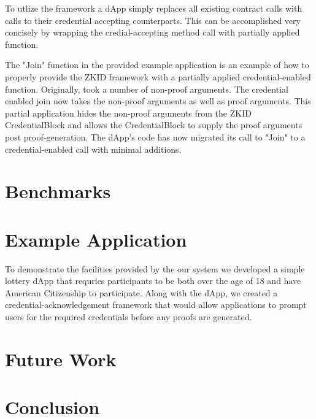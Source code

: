 \documentclass[11 pt]{extarticle}
\theoremstyle{remark}
\begin{document}
To utlize the framework a dApp simply replaces all existing contract calls with calls to their credential accepting counterparts. 
This can be accomplished very concisely by wrapping the credial-accepting method call with partially applied
function.

The "Join" function in the provided example application is an example of how to properly provide the ZKID framework with a partially applied credential-enabled function. Originally, took a number of non-proof arguments. 
The credential enabled join now takes the non-proof arguments as well as proof arguments. This partial application hides the non-proof arguments from the ZKID CredentialBlock and allows the CredentialBlock to 
supply the proof arguments post proof-generation. The dApp's code has now migrated its call to "Join" to a credential-enabled call with minimal additions.

\section{Benchmarks}

\section{Example Application}

To demonstrate the facilities provided by the our system we developed a simple lottery dApp that requries participants to be
both over the age of 18 and have American Citizenship to participate. Along with the dApp, we created a credential-acknowledgement
framework that would allow applications to prompt users for the required credentials before any proofs are generated.



\section{Future Work}

\section{Conclusion}



\end{document}
